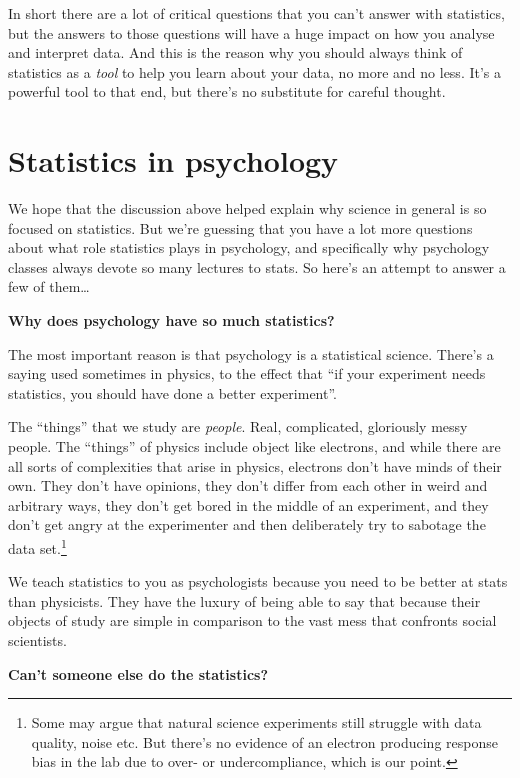 \documentclass[
  11pt,
  a4paper,
  twoside,symmetric,openright]{book}
\theoremstyle{break}
\theoremstyle{break}
\begin{document}
In short there are a lot of critical questions that you can't answer with statistics, but the answers to those questions will have a huge impact on how you analyse and interpret data. And this is the reason why you should always think of statistics as a \emph{tool} to help you learn about your data, no more and no less. It's a powerful tool to that end, but there's no substitute for careful thought.

\section{Statistics in psychology}\label{statistics-in-psychology}

We hope that the discussion above helped explain why science in general is so focused on statistics. But we're guessing that you have a lot more questions about what role statistics plays in psychology, and specifically why psychology classes always devote so many lectures to stats. So here's an attempt to answer a few of them\ldots{}

\textbf{Why does psychology have so much statistics?}

\nopagebreak[4]

The most important reason is that psychology is a statistical science. There's a saying used sometimes in physics, to the effect that ``if your experiment needs statistics, you should have done a better experiment''.

The ``things'' that we study are \emph{people}. Real, complicated, gloriously messy people. The ``things'' of physics include object like electrons, and while there are all sorts of complexities that arise in physics, electrons don't have minds of their own. They don't have opinions, they don't differ from each other in weird and arbitrary ways, they don't get bored in the middle of an experiment, and they don't get angry at the experimenter and then deliberately try to sabotage the data set.\footnote{Some may argue that natural science experiments still struggle with data quality, noise etc. But there's no evidence of an electron producing response bias in the lab due to over- or undercompliance, which is our point.}

We teach statistics to you as psychologists because you need to be better at stats than physicists. They have the luxury of being able to say that because their objects of study are simple in comparison to the vast mess that confronts social scientists.

\textbf{Can't someone else do the statistics?}
\end{document}
